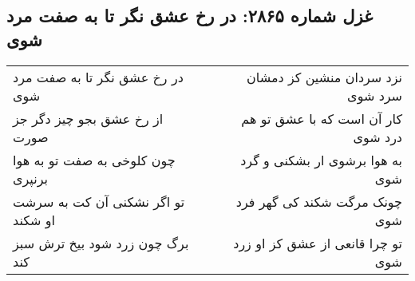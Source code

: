 \begin{center}
\section*{غزل شماره ۲۸۶۵: در رخ عشق نگر تا به صفت مرد شوی}
\label{sec:2865}
\begin{longtable}{l p{0.5cm} r}
در رخ عشق نگر تا به صفت مرد شوی
&&
نزد سردان منشین کز دمشان سرد شوی
\\
از رخ عشق بجو چیز دگر جز صورت
&&
کار آن است که با عشق تو هم درد شوی
\\
چون کلوخی به صفت تو به هوا برنپری
&&
به هوا برشوی ار بشکنی و گرد شوی
\\
تو اگر نشکنی آن کت به سرشت او شکند
&&
چونک مرگت شکند کی گهر فرد شوی
\\
برگ چون زرد شود بیخ ترش سبز کند
&&
تو چرا قانعی از عشق کز او زرد شوی
\\
\end{longtable}
\end{center}
